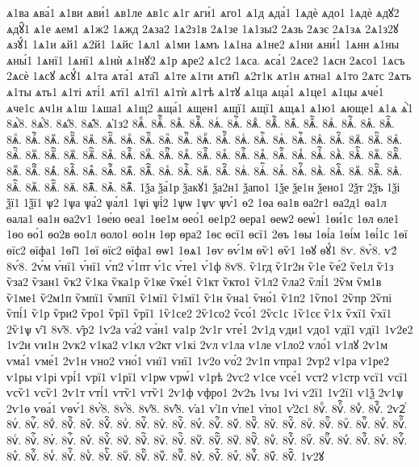 {ѧ1ва
ѧва́1
ѧ1ви
ѧви́1
ѧв1ле
ѧв1с
ѧ1г
ѧги́1
ѧго1
ѧ1д
ѧда́1
1ѧдѐ
ѧдо1
1ѧдѐ
ѧдꙋ2
ѧдꙋ̑1
ѧ1е
ѧем1
ѧ1ж2
1ѧжд
2ѧза2
1ѧ2з1в
2ѧ1зе
1ѧ1зы2
2ѧзь
2ѧзє
2ѧ1зѧ
2ѧ1з2ꙋ
ѧзꙋ́1
1ѧ1и
ѧй1
ѧ2й1
1ѧйс
1ѧл1
ѧ1ми
1ѧмъ
1ѧ1на
ѧ1не2
ѧ1ни
ѧни́1
1ѧнн
ѧ1ны
ѧны́1
1ѧнї1
1ѧнї1
ѧ1нѝ
ѧ1нꙋ2
ѧ1р
ѧре2
ѧ1с2
1ѧса.
ѧса́1
2ѧсе2
1ѧсн
2ѧсо1
1ѧсъ
2ѧсѐ
1ѧсꙋ
ѧсꙋ́1
ѧ1та
ѧта́1
ѧта̑1
ѧ1те
ѧ1ти
ѧти̑1
ѧ2т1к
ѧт1н
ѧтна1
ѧ1то
2ѧтс
2ѧтъ
ѧ1ты
ѧть1
ѧ1ті
ѧті́1
ѧтї1
ѧ1тї1
ѧ1тѝ
ѧ1тѣ
ѧ1тꙋ
ѧ1ца
ѧца́1
ѧ1це1
ѧ1цы
ѧче́1
ѧче1с
ѧч1н
ѧ1ш
1ѧша1
ѧ1щ2
ѧща́1
ѧщен1
ѧщї1
ѧщї1
ѧщѧ1
ѧ1ю1
ѧюще1
ѧ1ѧ
ѧ҆̀1
8ѧ҆̀8.
8ѧ҆́8.
8ѧ҆̈8.
8ѧ҆̑8.
ѧ҆1з2
8ѧⷠ.
8ѧⷠ҇.
8ѧⷡ.
8ѧⷡ҇.
8ѧⷢ.
8ѧⷢ҇.
8ѧⷣ.
8ѧⷣ҇.
8ѧⷤ.
8ѧⷤ҇.
8ѧⷥ.
8ѧⷥ҇.
8ѧⷦ.
8ѧⷦ҇.
8ѧⷧ.
8ѧⷧ҇.
8ѧⷨ.
8ѧⷨ҇.
8ѧⷩ.
8ѧⷩ҇.
8ѧⷪ.
8ѧⷪ҇.
8ѧⷫ.
8ѧⷫ҇.
8ѧⷬ.
8ѧⷬ҇.
8ѧⷭ.
8ѧⷭ҇.
8ѧⷮ.
8ѧⷮ҇.
8ѧⷯ.
8ѧⷯ҇.
8ѧⷰ.
8ѧⷰ҇.
8ѧⷱ.
8ѧⷱ҇.
8ѧⷲ.
8ѧⷲ҇.
8ѧⷳ.
8ѧⷳ҇.
8ѧⷴ.
8ѧⷴ҇.
8ѧⷵ.
8ѧⷵ҇.
8ѧⷶ.
8ѧⷶ҇.
8ѧⷷ.
8ѧⷷ҇.
8ѧⷸ.
8ѧⷸ҇.
8ѧⷹ.
8ѧⷹ҇.
8ѧⷺ.
8ѧⷺ҇.
8ѧⷻ.
8ѧⷻ҇.
8ѧⷼ.
8ѧⷼ҇.
8ѧⷽ.
8ѧⷽ҇.
8ѧⷾ.
8ѧⷾ҇.
8ѧⷿ.
8ѧⷿ҇.
8ѧꙴ.
8ѧꙴ҇.
8ѧꙵ.
8ѧꙵ҇.
8ѧꙶ.
8ѧꙶ҇.
8ѧꙷ.
8ѧꙷ҇.
8ѧꙸ.
8ѧꙸ҇.
8ѧꙹ.
8ѧꙹ҇.
8ѧꙺ.
8ѧꙺ҇.
8ѧꙻ.
8ѧꙻ҇.
8ѧ꙼.
8ѧ꙼҇.
8ѧ꙽.
8ѧ꙽҇.
1ѯа
ѯа́1р
ѯакꙋ1
ѯа2н1
ѯапо1
1ѯе
ѯе1н
ѯено1
2ѯт
2ѯъ
1ѯі
ѯї1
1ѯї1
ѱ2
1ѱа
ѱа́2
ѱа́л1
1ѱі
ѱі́2
1ѱѡ
1ѱѵ
ѱѵ́1
ѳ2
1ѳа
ѳа1в
ѳа2г1
ѳа2д1
ѳа1л
ѳала1
ѳа1н
ѳа2ѵ1
1ѳе́ю
ѳеа1
1ѳе1м
ѳео́1
ѳе1р2
ѳера1
ѳеѡ2
ѳеѡ́1
1ѳи́1с
1ѳл
ѳле1
1ѳо
ѳо́1
ѳо2в
ѳо1л
ѳоло1
ѳо1н
1ѳр
ѳра2
1ѳс
ѳсї1
ѳсї1
2ѳъ
1ѳы
1ѳі́а
1ѳі́м
1ѳі́1с
1ѳї
ѳїс2
ѳїфа1
1ѳі̑1
1ѳї
ѳїс2
ѳїфа1
ѳѡ1
1ѳѧ1
1ѳѵ
ѳѵ́1м
ѳѷ1
ѳѷ1
1ѳꙋ
ѳꙋ́1
8ѵ.
8ѵ̀8.
ѵ2́
8ѵ́8.
2ѵ́м
ѵ́нї1
ѵ́нї1
ѵ́п2
ѵ́1пт
ѵ́1с
ѵ́те1
ѵ́1ф
8ѵ̈8.
ѷ1гд
ѷ1г2н
ѷ1е
ѷе́2
ѷе1л
ѷ1з
ѷза2
ѷзан1
ѷк2
ѷ1ка
ѷка1р
ѷ1ке
ѷке́1
ѷ1кт
ѷкто1
ѷ1л2
ѷла2
ѷлі́1
2ѷм
ѷм1в
ѷ1ме1
ѷ2м1п
ѷмпї1
ѷмпї1
ѷ1мї1
ѷ1мї1
ѷ1н
ѷна1
ѷно́1
ѷ1п2
1ѷпо1
2ѷпр
2ѷпі
ѷпі́1
ѷ1р
ѷри2
ѷро1
ѷрї1
ѷрї1
1ѷ1се2
2ѷ1со2
ѷсо́1
2ѷс1с
1ѷ1сє
ѷ1х
ѷхї1
ѷхї1
2ѷ1ѱ
ѵ̑1
8ѵ̑8.
ѵ̑р2
1ѵ2а
ѵа́2
ѵа́н1
ѵа1р
2ѵ1г
ѵге́1
2ѵ1д
ѵди1
ѵдо1
ѵдї1
ѵдї1
1ѵ2е2
1ѵ2и
ѵи1н
2ѵк2
ѵ1ка2
ѵ1кл
ѵ2кт
ѵ1кі
2ѵл
ѵ1ла
ѵ1ле
ѵ1ло2
ѵло́1
ѵ1лꙋ
2ѵ1м
ѵма́1
ѵме́1
2ѵ1н
ѵно2
ѵно́1
ѵнї1
ѵнї1
1ѵ2о
ѵо́2
2ѵ1п
ѵпра1
2ѵр2
ѵ1ра
ѵ1ре2
ѵ1ры
ѵ1рі
ѵрі́1
ѵрї1
ѵ1рї1
ѵ1рѡ
ѵрѡ́1
ѵ1рѣ
2ѵс2
ѵ1се
ѵсе́1
ѵст2
ѵ1стр
ѵсї1
ѵсї1
ѵсѷ1
ѵсѷ1
2ѵ1т
ѵті́1
ѵтѷ1
ѵтѷ1
2ѵ1ф
ѵфро1
2ѵ2ъ
1ѵы
1ѵі
ѵ2ї1
1ѵ2ї1
ѵ1ѯ
2ѵ1ѱ
2ѵ1ѳ
ѵѳа́1
ѵѳѵ́1
8ѵ҆̀8.
8ѵ҆́8.
8ѵ҆̈8.
8ѵ҆̑8.
ѵ҆а1
ѵ҆1п
ѵ҆пе1
ѵ҆по1
ѵ҆2с1
8ѵⷠ.
8ѵⷠ҇.
8ѵⷡ.
8ѵⷡ҇.
2ѵ2ⷢ
8ѵⷢ.
8ѵⷢ҇.
8ѵⷣ.
8ѵⷣ҇.
8ѵⷤ.
8ѵⷤ҇.
8ѵⷥ.
8ѵⷥ҇.
8ѵⷦ.
8ѵⷦ҇.
8ѵⷧ.
8ѵⷧ҇.
8ѵⷨ.
8ѵⷨ҇.
8ѵⷩ.
8ѵⷩ҇.
8ѵⷪ.
8ѵⷪ҇.
8ѵⷫ.
8ѵⷫ҇.
8ѵⷬ.
8ѵⷬ҇.
8ѵⷭ.
8ѵⷭ҇.
8ѵⷮ.
8ѵⷮ҇.
8ѵⷯ.
8ѵⷯ҇.
8ѵⷰ.
8ѵⷰ҇.
8ѵⷱ.
8ѵⷱ҇.
8ѵⷲ.
8ѵⷲ҇.
8ѵⷳ.
8ѵⷳ҇.
8ѵⷴ.
8ѵⷴ҇.
8ѵⷵ.
8ѵⷵ҇.
8ѵⷶ.
8ѵⷶ҇.
8ѵⷷ.
8ѵⷷ҇.
8ѵⷸ.
8ѵⷸ҇.
8ѵⷹ.
8ѵⷹ҇.
8ѵⷺ.
8ѵⷺ҇.
8ѵⷻ.
8ѵⷻ҇.
8ѵⷼ.
8ѵⷼ҇.
8ѵⷽ.
8ѵⷽ҇.
8ѵⷾ.
8ѵⷾ҇.
8ѵⷿ.
8ѵⷿ҇.
1ѵ2ꙋ
}
